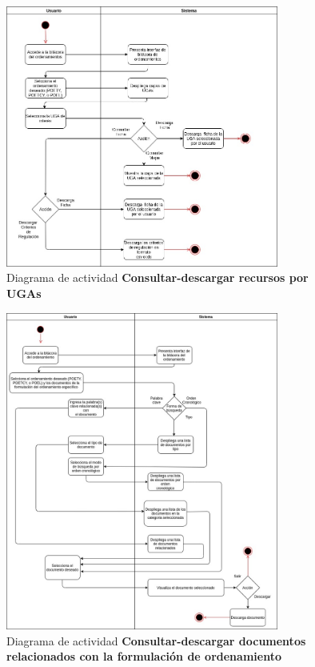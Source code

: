\pagebreak
\begin{figure}[h]
\centering
\caption{Diagrama de actividad \textbf{Consultar-descargar recursos por UGAs}}\label{fig:priorReq}
\includegraphics[width=0.8\textwidth, height=.5\textwidth]{images/diag_act_consultardescargar_UGAs}
\end{figure}

\pagebreak
\begin{figure}[h]
\centering
\caption{Diagrama de actividad \textbf{Consultar-descargar documentos relacionados con la formulación de ordenamiento}}\label{fig:priorReq}
\includegraphics[width=0.8\textwidth, height=.6\textwidth]{images/diag_act_consultardescargar_doc_relac_form}
\end{figure}


